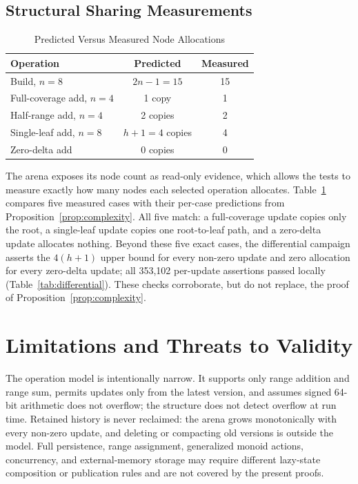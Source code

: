 \documentclass[conference]{IEEEtran}
\begin{document}
\subsection{Structural Sharing Measurements}

\begin{table}[!t]
\caption{Predicted Versus Measured Node Allocations}
\label{tab:copies}
\centering
\footnotesize
\renewcommand{\arraystretch}{1.25}
\begin{tabular}{@{}lcc@{}}
\toprule
\textbf{Operation} & \textbf{Predicted} & \textbf{Measured} \\
\midrule
Build, $n = 8$ & $2n-1 = 15$ & 15 \\
Full-coverage add, $n = 4$ & 1 copy & 1 \\
Half-range add, $n = 4$ & 2 copies & 2 \\
Single-leaf add, $n = 8$ & $h+1 = 4$ copies & 4 \\
Zero-delta add & 0 copies & 0 \\
\bottomrule
\end{tabular}
\end{table}

The arena exposes its node count as read-only evidence, which allows the tests to measure exactly
how many nodes each selected operation allocates. Table~\ref{tab:copies} compares five measured
cases with their per-case predictions from Proposition~\ref{prop:complexity}. All five match: a
full-coverage update copies only the root, a single-leaf update copies one root-to-leaf path, and a
zero-delta update allocates nothing. Beyond these five exact cases, the differential campaign
asserts the $4(h+1)$ upper bound for every non-zero update and zero allocation for every
zero-delta update; all 353{,}102 per-update assertions passed locally
(Table~\ref{tab:differential}). These checks corroborate, but do not replace, the proof of
Proposition~\ref{prop:complexity}.

\section{Limitations and Threats to Validity}
\label{sec:limitations}

The operation model is intentionally narrow. It supports only range addition and range sum,
permits updates only from the latest version, and assumes signed 64-bit arithmetic does not
overflow; the structure does not detect overflow at run time. Retained history is never
reclaimed: the arena grows monotonically with every non-zero update, and deleting or compacting
old versions is outside the model. Full persistence, range
assignment, generalized monoid actions, concurrency, and external-memory storage may require
different lazy-state composition or publication rules and are not covered by the present proofs.
\end{document}
